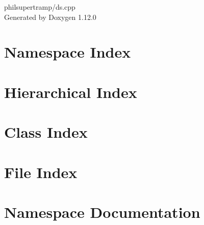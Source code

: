\documentclass[twoside]{book}
\newcommand{\+}{\discretionary{\mbox{\scriptsize$\hookleftarrow$}}{}{}}
\newcommand{\clearemptydoublepage}{%
    \newpage{\pagestyle{empty}\cleardoublepage}%
  }
\begin{document}
  \raggedbottom
    \hypersetup{pageanchor=false,
                bookmarksnumbered=true,
                pdfencoding=unicode
               }
  \begin{titlepage}
  \vspace*{7cm}
  \begin{center}%
  {\Large philsupertramp/ds.\+cpp}\\
  \vspace*{1cm}
  {\large Generated by Doxygen 1.12.0}\\
  \end{center}
  \end{titlepage}
  \clearemptydoublepage
  \tableofcontents
  \clearemptydoublepage
  \hypersetup{pageanchor=true}






\chapter{Namespace Index}

\chapter{Hierarchical Index}

\chapter{Class Index}

\chapter{File Index}

\chapter{Namespace Documentation}

\end{document}
